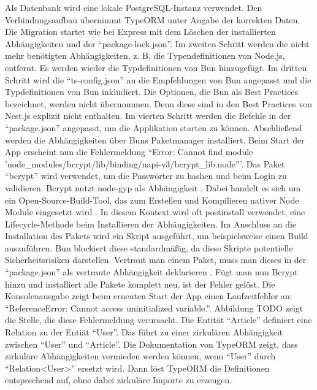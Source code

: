 \noindent
Als Datenbank wird eine lokale PostgreSQL-Instanz verwendet. Den Verbindungsaufbau übernimmt TypeORM unter Angabe der korrekten Daten. Die Migration startet wie bei Express mit dem Löschen der installierten Abhängigkeiten und der ``package-lock.json''. Im zweiten Schritt werden die nicht mehr benötigten Abhängigkeiten, z. B. die Typendefinitionen von Node.js, entfernt. Es werden wieder die Typdefinitionen von Bun hinzugefügt. Im dritten Schritt wird die ``ts-config.json'' an die Empfehlungen von Bun angepasst und die Typdefinitionen von Bun inkludiert. Die Optionen, die Bun als Best Practices bezeichnet, werden nicht übernommen. Denn diese sind in den Best Practices von Nest.js explizit nicht enthalten. Im vierten Schritt werden die Befehle in der ``package.json'' angepasst, um die Applikation starten zu können. Abschließend werden die Abhängigkeiten über Buns Paketmanager installiert.\newline
Beim Start der App erscheint nun die Fehlermeldung ``Error: Cannot find module 'node\_modules/bcrypt/lib/binding/napi-v3/bcrypt\_lib.node'''. Das Paket ``bcrypt'' wird verwendet, um die Passwörter zu hashen und beim Login zu validieren. Bcrypt nutzt node-gyp als Abhängigkeit . Dabei handelt es sich um ein Open-Source-Build-Tool, das zum Erstellen und Kompilieren nativer Node Module eingesetzt wird . In diesem Kontext wird oft postinstall verwendet, eine Lifecycle-Methode beim Installieren der Abhängigkeiten. Im Anschluss an die Installation des Pakets wird ein Skript ausgeführt, um beispielsweise einen Build auszuführen. Bun blockiert diese standardmäßig, da diese Skripte potentielle Sicherheitsrisiken darstellen. Vertraut man einem Paket, muss man dieses in der ``package.json'' als vertraute Abhängigkeit deklarieren . Fügt man nun Bcrypt hinzu und installiert alle Pakete komplett neu, ist der Fehler gelöst. \newline
Die Konsolenausgabe zeigt beim erneuten Start der App einen Laufzeitfehler an: ``ReferenceError: Cannot access uninitialized variable.''. Abbildung TODO zeigt die Stelle, die diese Fehlermeldung verursacht. Die Entität ``Article'' definiert eine Relation zu der Entiät ``User''. Das führt zu einer zirkulären Abhängigkeit zwischen ``User'' und ``Article''. Die Dokumentation von TypeORM zeigt, dass zirkuläre Abhängigkeiten vermieden werden können, wenn ``User'' durch ``Relation<User>'' ersetzt wird. Dann löst TypeORM die Definitionen entsprechend auf, ohne dabei zirkuläre Importe zu erzeugen. \\

